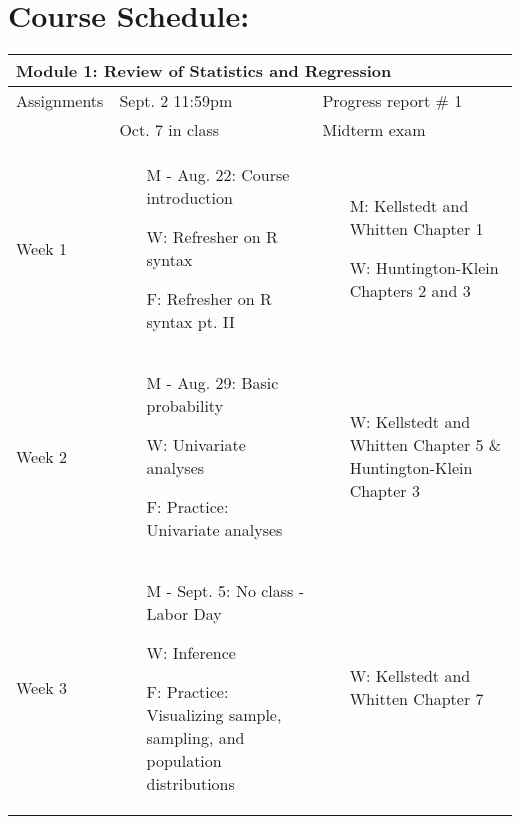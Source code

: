 \documentclass[11pt, a4paper]{article}
\begin{document}
\section*{Course Schedule:}
\begin{longtable}[hbt!]{p{}p{}p{}}
        \hline 
        \multicolumn{3}{l}{\textbf{Module 1: Review of Statistics and Regression}} \\
        \hline
        Assignments & Sept. 2 \@ 11:59pm & Progress report \# 1 \\
         & Oct. 7 in class & Midterm exam \\
        \hline
        Week 1 & \begin{itemize} \item[M - Aug. 22:] Course introduction \item[W:] Refresher on R syntax \item[F:] Refresher on R syntax pt. II \end{itemize} & \begin{itemize} \item[M:] Kellstedt and Whitten Chapter 1 \item[W:] Huntington-Klein Chapters 2 and 3 \end{itemize}\\
        \hline 
        Week 2 & \begin{itemize} \item[M - Aug. 29:] Basic probability \item[W:] Univariate analyses \item[F:] Practice: Univariate analyses \end{itemize} & \begin{itemize} \item[W:] Kellstedt and Whitten Chapter 5 \& Huntington-Klein Chapter 3 \end{itemize}\\
        \hline 
        Week 3 & \begin{itemize} \item[M - Sept. 5:] No class - Labor Day \item[W:] Inference \item[F:] Practice: Visualizing sample, sampling, and population distributions \end{itemize} & \begin{itemize} \item[W:] Kellstedt and Whitten Chapter 7 \end{itemize} \\

\end{longtable}
\end{document}
